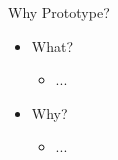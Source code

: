 \begin{Slide}{Why Prototype?}
\begin{itemize}
\item What?
\begin{itemize}
\item ...
\end{itemize}
\item Why?
\begin{itemize}
\item ...

\end{itemize}
\end{itemize}
\end{Slide}
